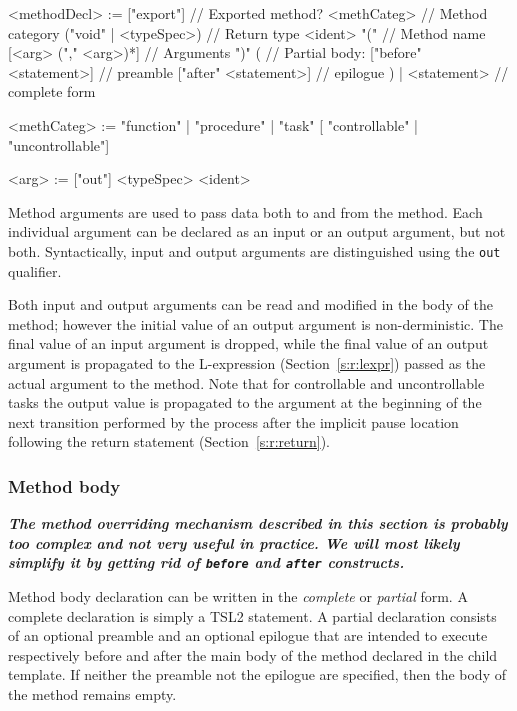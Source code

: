 \documentclass{report}
\newcommand{\src}[1]{\texttt{#1}}
\newcommand{\tsl}{TSL2 }
\newcommand{\comment}[1]{{\textit{\textbf{#1}}}}
\begin{document}
\begin{bnflisting}{}
<methodDecl> := ["export"]               // Exported method?
                <methCateg>              // Method category
                ("void" | <typeSpec>)       // Return type
                <ident> "("                 // Method name
                    [<arg> ("," <arg>)*]    // Arguments
                ")"
                    (                       // Partial body:
                     ["before" <statement>] // preamble
                     ["after" <statement>]  // epilogue
                    ) |
                    <statement>             // complete form

<methCateg> := "function"
             | "procedure"
             | "task" [ "controllable" 
                      | "uncontrollable"]

<arg> := ["out"] <typeSpec> <ident>
\end{bnflisting}

Method arguments are used to pass data both to and from the 
method.  Each individual argument can be declared as an input or 
an output argument, but not both.  Syntactically, input and output 
arguments are distinguished using the \src{out} qualifier.

Both input and output arguments can be read and modified in the 
body of the method; however the initial value of an output 
argument is non-derministic.  The final value of an input argument 
is dropped, while the final value of an output argument is 
propagated to the L-expression (Section~\ref{s:r:lexpr}) passed as 
the actual argument to the method.  Note that for controllable and 
uncontrollable tasks the output value is propagated to the 
argument at the beginning of the next transition performed by the 
process after the implicit pause location following the return 
statement (Section~\ref{s:r:return}).

\subsubsection{Method body}

\comment{The method overriding mechanism described in this section 
is probably too complex and not very useful in practice.  We will 
most likely simplify it by getting rid of \src{before} and \src{after}
constructs.}

Method body declaration can be written in the \emph{complete} or 
\emph{partial} form.  A complete declaration is simply a \tsl 
statement.  A partial declaration consists of an optional preamble 
and an optional epilogue that are intended to execute respectively 
before and after the main body of the method declared in the child 
template.  If neither the preamble not the epilogue are specified, 
then the body of the method remains empty.  
\end{document}
